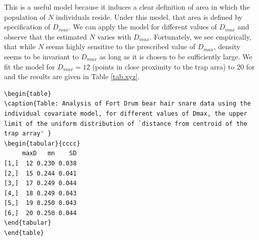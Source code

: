 This is a useful model because it induces a clear definition of area
in which the population of $N$ individuals reside. Under this model,
that area is defined by specification of $D_{max}$. We can apply the model
for different values of $D_{max}$ and observe that the estimated $N$ varies
with $D_{max}$. Fortunately, we see empirically, that while $N$ seems
highly sensitive to the prescribed value of $D_{max}$, density seems to
be invariant to $D_{max}$ as long as it is chosen to be sufficiently
large. We fit the model for $D_{max}=12$ (points in close proximity to
the trap arra) to 20 for and the results are given in Table
\ref{tab.xyz}.

\begin{verbatim}
\begin{table}
\caption{Table: Analysis of Fort Drum bear hair snare data using the individual covariate model, for different values of Dmax, the upper limit of the uniform distribution of `distance from centroid of the trap array' }
\begin{tabular}{cccc}
     maxD   mn    SD
[1,]  12 0.230 0.038
[2,]  15 0.244 0.041
[3,]  17 0.249 0.044
[4,]  18 0.249 0.043
[5,]  19 0.250 0.043
[6,]  20 0.250 0.044
\end{tabular}
\end{table}
\end{verbatim}

